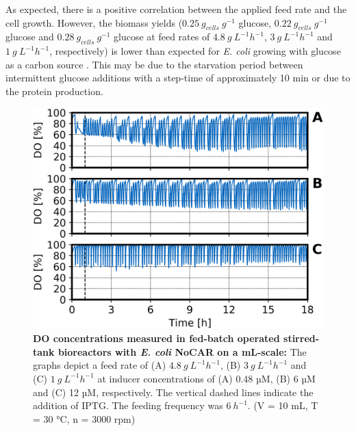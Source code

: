 \documentclass[sn-standardnature]{sn-jnl}%
\theoremstyle{thmstyleone}%
\theoremstyle{thmstyletwo}%
\theoremstyle{thmstylethree}%
\begin{document}
As expected, there is a positive correlation between the applied feed rate and the cell growth.
However, the biomass yields ($0.25\ g_{cells}\ g^{-1}$ glucose, $0.22\ g_{cells}\ g^{-1}$ glucose and $0.28\ g_{cells}\ g^{-1}$ glucose at feed rates of $4.8\ g\ L^{-1} h^{-1}$, $3\ g\ L^{-1} h^{-1}$ and $1\ g\ L^{-1} h^{-1}$, respectively) is lower than expected for \textit{E. coli} growing with glucose as a carbon source \cite{schmideder2015novel}.
This may be due to the starvation period between intermittent glucose additions with a step-time of approximately 10 min or due to the protein production.

\begin{figure}[H]
    \centering
    \includegraphics[width=1.0\textwidth]{figures/O2_overview.png}
    \caption{
        \textbf{DO concentrations measured in fed-batch operated stirred-tank bioreactors with \textit{E. coli} NoCAR on a mL-scale:}
        The graphs depict a feed rate of (A) $4.8\ g\ L^{-1} h^{-1}$, (B) $3\ g\ L^{-1} h^{-1}$ and (C) $1\ g\ L^{-1} h^{-1}$ at inducer concentrations of (A) 0.48 µM, (B) 6 µM and (C) 12 µM, respectively.
        The vertical dashed lines indicate the addition of IPTG.
        The feeding frequency was $6\ h^{-1}$.
        (V = 10 mL, T = 30 °C, n = 3000 rpm)
    }
    \label{fig_o2overview}
\end{figure}
\end{document}

